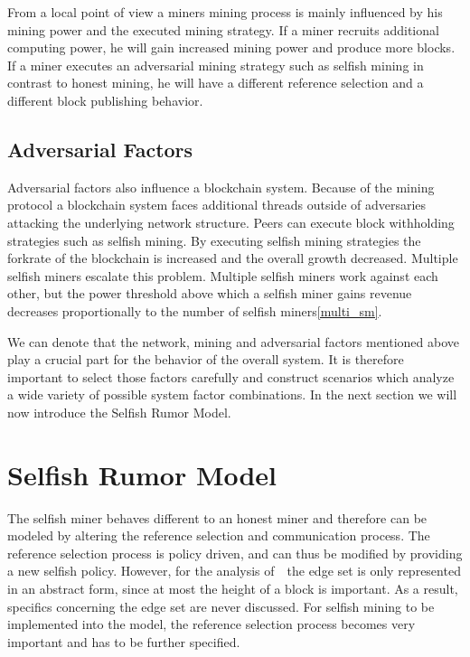 From a local point of view a miners mining process is mainly influenced by his mining power and the executed mining strategy. If a miner recruits additional computing power, he will gain increased mining power and produce more blocks. If a miner executes an adversarial mining strategy such as selfish mining in contrast to honest mining, he will have a different reference selection and a different block publishing behavior.

\subsection{Adversarial Factors}
Adversarial factors also influence a blockchain system. Because of the mining protocol a blockchain system faces additional threads outside of adversaries attacking the underlying network structure. Peers can execute block withholding strategies such as selfish mining. By executing selfish mining strategies the forkrate of the blockchain is increased and the overall growth decreased. Multiple selfish miners escalate this problem. Multiple selfish miners work against each other, but the power threshold above which a selfish miner gains revenue decreases proportionally to the number of selfish miners\ref{multi_sm}.


We can denote that the network, mining and adversarial factors mentioned above play a crucial part for the behavior of the overall system. It is therefore important to select those factors carefully and construct scenarios which analyze a wide variety of possible system factor combinations. In the next section we will now introduce the Selfish Rumor Model.

\section{Selfish Rumor Model}\label{selfishmodel}
The selfish miner behaves different to an honest miner and therefore can be modeled by altering the reference selection and communication process. The reference selection process is policy driven, and can thus be modified by providing a new selfish policy. However, for the analysis of~~the edge set is only represented in an abstract form, since at most the height of a block is important. As a result, specifics concerning the edge set are never discussed. For selfish mining to be implemented into the model, the reference selection process becomes very important and has to be further specified.
